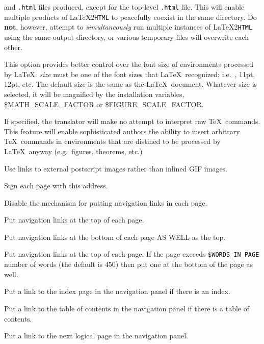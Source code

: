 \documentclass[dvips]{article}
\newcommand{\latextohtml}{\LaTeX 2\texttt{HTML}}
\newcommand{\fn}[1]{{\ttfamily #1}}	%
\begin{document}
\begin{htmllist}
\begin{changebar}
  and \texttt{.html} files produced, except for the top-level \texttt{.html}
  file.  This will enable multiple products of \latextohtml{} to
  peacefully coexist in the same directory.  Do \textbf{not}, however,
  attempt to \emph{simultaneously} run multiple instances of
  \latextohtml{} using the same output directory, or various temporary
  files will overwrite each other.
\item [-font\_size \textsl{size}]
  This option provides better control over the font size of environments
  processed by \LaTeX.  \textsl{size} must be one of the font sizes
  that \LaTeX\ recognized; i.e.\ \fn{10pt, 11pt, 12pt}, etc.  The
  default size is the same as the \LaTeX\ document.  Whatever size is
  selected, it will be magnified by the installation variables,
  \$MATH\_SCALE\_FACTOR or \$FIGURE\_SCALE\_FACTOR.
\item [-no\_tex\_defs]
  If specified, the translator will make no attempt to interpret
  raw \TeX\ commands.  This feature will enable sophisticated authors
  the ability to insert arbitrary \TeX\ commands in environments
  that are distined to be processed by \LaTeX\ anyway (e.g.\ figures,
  theorems, etc.)
\end{changebar}
\item [-ps\_images]
Use links to external postscript images rather than inlined GIF images.
\item [-address \textsl{author-address}]
Sign each page with this address. \label{navoptions} 
\item [-no$\_$navigation]
Disable the mechanism for putting navigation links in 
each page.
\item [-top$\_$navigation]
Put navigation links 
at the top of each page.    
\item [-bottom$\_$navigation]
Put navigation links 
at the bottom of each page AS WELL as the top.
\item [-auto$\_$navigation]
Put navigation links
at the top of each page. If the page exceeds \verb|$WORDS_IN_PAGE| number of words
(the default is 450) then put one at the bottom of the page as well.
\item [-index$\_$in$\_$navigation]
Put a link to the index page in the navigation panel if there is an index.
\item [-contents$\_$in$\_$navigation]
Put a link to the table of contents in the navigation panel if there is a 
table of contents.
\item [-next\_page\_in\_navigation]
Put a link to the next logical page in the navigation panel.

\end{htmllist}
\end{document}
